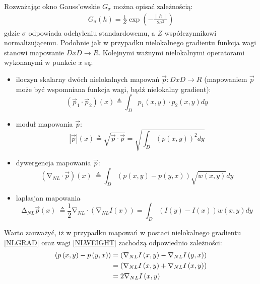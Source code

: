 \documentclass[12pt, twoside, openany]{report}
\theoremstyle{definition}
\begin{document}
Rozważając okno Gauss'owskie $G_\sigma$ można opisać zależnością:
\begin{align}
G_\sigma(h)=\frac{1}{Z}\exp(-\frac{\|h\|}{2\sigma^2})
\label{oknoGaussowskie}
\end{align}
gdzie $\sigma$ odpowiada odchyleniu standardowemu, a $Z$ współczynnikowi normalizującemu. Podobnie jak w przypadku nielokalnego gradientu funkcja wagi stanowi mapowanie $DxD\longrightarrow R$. Kolejnymi ważnymi nielokalnymi operatorami wykonanymi w punkcie $x$ są: 
\begin{itemize}
\item
iloczyn skalarny dwóch nielokalnych mapowań $\overrightarrow{p}:DxD\longrightarrow R$ (mapowaniem $\overrightarrow{p}$ może być wspomniana funkcja wagi, bądź nielokalny gradient):
\begin{equation}
\left({\overrightarrow{p}}_1\cdot {\overrightarrow{p}}_2\right)(x)\triangleq \int_D{p_1(x,y)\cdot p_2\left(x,y\right)dy}
\label{NLPRODUCT}
\end{equation}
\item
moduł mapowania $\overrightarrow{p}$:
\begin{equation}
\left|\overrightarrow{p}\right|\left(x\right)\triangleq \sqrt{\overrightarrow{p}\cdot \overrightarrow{p}}=\sqrt{\int_D{{\left(p\left(x,y\right)\right)}^2dy}} 
\label{NLMOD}
\end{equation}
\item
dywergencja mapowania $\overrightarrow{p}$:
\begin{equation}
({\mathrm{\nabla }}_{NL}\cdot \overrightarrow{p})(x)\ \triangleq \int_D{\left(p\left(x,y\right)-p\left(y,x\right)\right)\sqrt{w(x,y)}dy}
\label{NLDIV}
\end{equation}
\item
laplasjan mapowania
\begin{equation}
{\mathrm{\Delta }}_{NL}\overrightarrow{p}(x)\ \triangleq \frac{1}{2}{\mathrm{\nabla }}_{NL}\cdot \left({\mathrm{\nabla }}_{NL}I\left(x\right)\right)=\int_D{\left(I\left(y\right)-I\left(x\right)\right)w(x,y)dy}
\label{NLLAP}
\end{equation}
\end{itemize}
Warto zauważyć, iż w przypadku mapowań w postaci nielokalnego gradientu \eqref{NLGRAD} oraz wagi \eqref{NLWEIGHT} zachodzą odpowiednio zależności:
\begin{align}
\left(p\left(x,y\right)-p\left(y,x\right)\right) &= \left({\mathrm{\nabla }}_{NL}I\left(x,y\right)-{\mathrm{\nabla }}_{NL}I\left(y,x\right)\right)  \notag \\ 
&= \left({\mathrm{\nabla }}_{NL}I\left(x,y\right)+{\mathrm{\nabla }}_{NL}I\left(x,y\right)\right) \notag \\
&=2{\mathrm{\nabla }}_{NL}I\left(x,y\right)\
\label{NLPOM}
\end{align}
\end{document}
